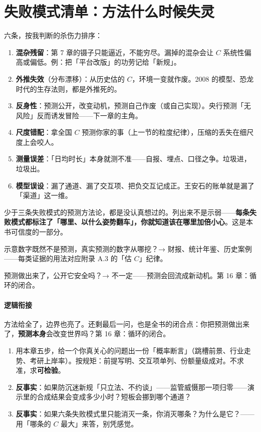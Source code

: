 \documentclass[../../main2.tex]{subfiles}
\begin{document}
\section{失败模式清单：方法什么时候失灵}

六条，按我判断的杀伤力排序：

\begin{enumerate}
	\item \textbf{混杂残留}：第 7 章的镊子只能逼近，不能穷尽。漏掉的混杂会让 $C$ 系统性偏高或偏低。例：把「平台改版」的功劳记给「新规」。
	\item \textbf{外推失效}（分布漂移）：从历史估的 $C$，环境一变就作废。2008 的模型、恐龙时代的生存法则，都是外推死的。
	\item \textbf{反身性}：预测公开，改变动机，预测自己作废（或自己实现）。央行预测「无风险」反而诱发冒险——下一章的主角。
	\item \textbf{尺度错配}：拿全国 $C$ 预测你家的事（上一节的粒度纪律），压缩的丢失在细尺度上会咬人。
	\item \textbf{测量误差}：「日均时长」本身就测不准——自报、埋点、口径之争。垃圾进，垃圾出。
	\item \textbf{模型误设}：漏了通道、漏了交互项、把负交互记成正。王安石的账单就是漏了「渠道」这一维。
\end{enumerate}

\begin{warningbox}
	少于三条失败模式的预测方法论，都是没认真想过的。列出来不是示弱——\textbf{每条失败模式都标注了「哪里、以什么姿势翻车」，你就知道该在哪里加倍小心}。这是本书可信度的一部分。
\end{warningbox}

\begin{reader_anticipation}
	\item 示意数字既然不是预测，真实预测的数字从哪挖？→ 财报、统计年鉴、历史案例——每类证据的用法对应附录 A.3 的「估 $C$」纪律。
	\item 预测做出来了，公开它安全吗？→ 不一定——预测会回流成新动机。第 16 章：循环的闭合。
\end{reader_anticipation}

\paragraph*{逻辑衔接}
	方法给全了，边界也亮了。还剩最后一问，也是全书的闭合点：你把预测做出来了，\textbf{预测本身}会改变世界吗？第 16 章：循环的闭合。

\begin{thinkbox}
\begin{enumerate}
	\item 用本章五步，给一个你真关心的问题出一份「概率断言」（跳槽前景、行业走势、考研上岸率）。按规矩：前提写明、交互项单列、份额量级成对。不求准，求\textbf{可检验}。
	\item \textbf{反事实}：如果防沉迷新规「只立法、不约谈」——监管威慑那一项归零——演示里的合成结果会变成多少小时？短板会挪到哪个通道？
	\item \textbf{反事实}：如果六条失败模式里只能消灭一条，你消灭哪条？为什么是它？——用「哪条的 $C$ 最大」来答，别凭感觉。
\end{enumerate}
\end{thinkbox}
\end{document}
